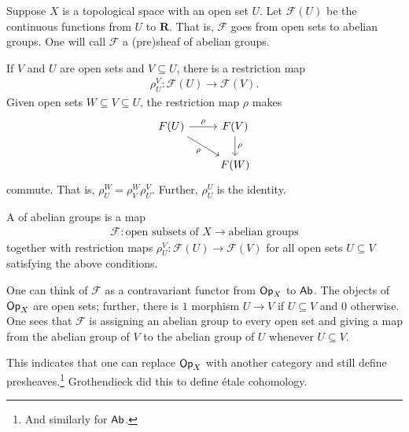 \documentclass [11 pt, oneside] {article}
\begin{document}
\begin{example}[Motivation]\label{}\text{}
Suppose $X$ is a topological space with an open set $U$. Let $\mathscr{F}(U)$ be the continuous functions from $U$ to $\mathbf{R}$. That is, $\mathscr{F}$ goes from open sets to abelian groups. One will call $\mathscr{F}$ a (pre)sheaf of abelian groups. 

If $V$ and $U$ are open sets and $V\subseteq U$, there is a restriction map
\begin{align*}
	\rho_{U}^V : \mathscr{F}(U)  \longrightarrow \mathscr{F}(V).
\end{align*}
Given open sets $W\subseteq V\subseteq U$, the restriction map $\rho$ makes
\[
\begin{tikzcd}
	\mathscr{F}(U)\ar[r,"\rho"] \ar[dr,"\rho", swap] &  \mathscr{F}(V)\ar[d,"\rho"] \\
						   & \mathscr{F}(W)
\end{tikzcd}
\]
commute. That is, $\rho_{U}^W = \rho_{V}^W \rho_{U}^V$. Further, $\rho_{U}^U$ is the identity.

A  of abelian groups is a map
\begin{align*}
	\mathscr{F} : \textrm{open subsets of $X$} \longrightarrow \textrm{abelian groups}
\end{align*}
together with restriction maps $\rho_{U}^V : \mathscr{F}(U) \longrightarrow  \mathscr{F}(V)$ for all open sets $U\subseteq V$ satisfying the above conditions. 
\end{example}

One can think of $\mathscr{F}$ as a contravariant functor from $\textsf{Op}_X$ to $\textsf{Ab}$. The objects of $\textsf{Op}_X$ are open sets; further, there is $1$ morphism $U\longrightarrow V$ if $U\subseteq V$ and $0$ otherwise. One sees that $\mathscr{F}$ is assigning an abelian group to every open set and giving a map from the abelian group of $V$ to the abelian group of $U$ whenever $U\subseteq V$.

\begin{remark}
	This indicates that one can replace $\textsf{Op}_X$ with another category and still define presheaves.\footnote{And similarly for $\textsf{Ab}$.} Grothendieck did this to define \'etale cohomology.
\end{remark}
\end{document}
